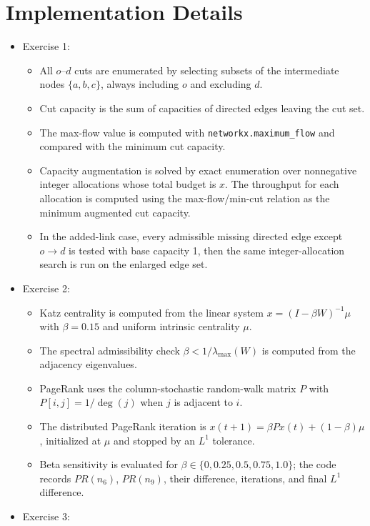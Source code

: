 \documentclass[11pt,a4paper]{article}
\begin{document}
\section{Implementation Details}

\begin{itemize}
    \item Exercise 1:
    \begin{itemize}
        \item All $o$--$d$ cuts are enumerated by selecting subsets of the intermediate nodes $\{a,b,c\}$, always including $o$ and excluding $d$.
        \item Cut capacity is the sum of capacities of directed edges leaving the cut set.
        \item The max-flow value is computed with \texttt{networkx.maximum\_flow} and compared with the minimum cut capacity.
        \item Capacity augmentation is solved by exact enumeration over nonnegative integer allocations whose total budget is $x$. The throughput for each allocation is computed using the max-flow/min-cut relation as the minimum augmented cut capacity.
        \item In the added-link case, every admissible missing directed edge except $o\to d$ is tested with base capacity 1, then the same integer-allocation search is run on the enlarged edge set.
    \end{itemize}
    \item Exercise 2:
    \begin{itemize}
        \item Katz centrality is computed from the linear system $x=(I-\beta W)^{-1}\mu$ with $\beta=0.15$ and uniform intrinsic centrality $\mu$.
        \item The spectral admissibility check $\beta<1/\lambda_{\max}(W)$ is computed from the adjacency eigenvalues.
        \item PageRank uses the column-stochastic random-walk matrix $P$ with $P[i,j]=1/\deg(j)$ when $j$ is adjacent to $i$.
        \item The distributed PageRank iteration is $x(t+1)=\beta P x(t)+(1-\beta)\mu$, initialized at $\mu$ and stopped by an $L^1$ tolerance.
        \item Beta sensitivity is evaluated for $\beta\in\{0,0.25,0.5,0.75,1.0\}$; the code records $PR(n_6)$, $PR(n_9)$, their difference, iterations, and final $L^1$ difference.
    \end{itemize}
    \item Exercise 3:

\end{itemize}
\end{document}
